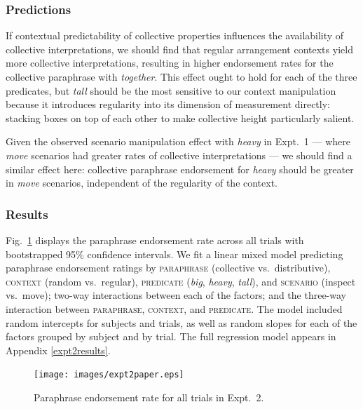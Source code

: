 \documentclass[linguex]{sp}
\begin{document}
\subsubsection{Predictions}

If contextual predictability of collective properties influences the availability of collective interpretations, we should find that regular arrangement contexts yield more collective interpretations, resulting in higher endorsement rates for the collective paraphrase with \emph{together}. This effect ought to hold for each of the three predicates, but \emph{tall} should be the most sensitive to our context manipulation because it introduces regularity into its dimension of measurement directly: stacking boxes on top of each other to make collective height particularly salient.

Given the observed scenario manipulation effect with \emph{heavy} in Expt.~1 --- where \emph{move} scenarios had greater rates of collective interpretations --- we should find a similar effect here: collective paraphrase endorsement for \emph{heavy} should be greater in \emph{move} scenarios, independent of the regularity of the context. %

\subsubsection{Results}


Fig.\ \ref{resultsexpt2} displays the paraphrase endorsement rate across all trials with bootstrapped 95\% confidence intervals. We fit a linear mixed model predicting paraphrase endorsement ratings by \textsc{paraphrase} (collective vs.~distributive), \textsc{context} (random vs.~regular),
\textsc{predicate} (\emph{big}, \emph{heavy}, \emph{tall}),
and \textsc{scenario} (inspect vs.~move); two-way interactions between each of the factors; and the three-way interaction between \textsc{paraphrase}, \textsc{context}, and \textsc{predicate}. The model included random intercepts for subjects and trials, as well as random slopes for each of the factors grouped by subject and by trial. The full regression model appears in Appendix \ref{expt2results}.

\begin{figure}[h!]
\centering
\texttt{[image: images/expt2paper.eps]} 
\vspace{-15pt}
\caption{Paraphrase endorsement rate for all trials in Expt.~2.}\label{resultsexpt2}
\end{figure}
\end{document}

